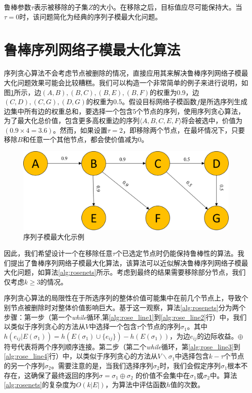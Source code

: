 鲁棒参数\(\tau\)表示被移除的子集\(Z\)的大小。在移除之后，目标值应尽可能保持大。当\(\tau = 0\)时，该问题简化为经典的序列子模最大化问题\cite{mitrovic2018submodularity}。

\section{鲁棒序列网络子模最大化算法}
\label{sec:3_2}

序列贪心算法\cite{mitrovic2018submodularity}不会考虑节点被删除的情况，直接应用其来解决鲁棒序列网络子模最大化问题效果可能会比较糟糕。我们可以构造一个非常简单的例子来进行说明，如图\ref{fig:rose_sample}所示，边$(A,B),(B,C),(B,E),(B,F)$的权重为0.9，边$(C,D),(C,G),(D,G)$的权重为0.5。假设目标网络子模函数\(f\)是所选序列生成边集中所有边的权重总和，要选择一个包含5个节点的序列，使用序列贪心算法，为了最大化总价值，包含更多高权重边的序列\(\langle A,B,C,E,F \rangle\)将会被选中，价值为\((0.9 \times 4 = 3.6)\)。然而，如果设置\(\tau=2\)，即移除两个节点，在最坏情况下，只要移除\(B\)和任意一个其他节点，都会使价值减为$0$。

\begin{figure}[th]
    \centering
    \includegraphics[width=.89\linewidth]{figure/rosenets/sample2}
    \caption{序列子模最大化示例}
    \label{fig:rose_sample}
\end{figure}

因此，我们希望设计一个在移除任意$\tau$个已选定节点时仍能保持鲁棒性的算法。我们提出了鲁棒序列网络子模最大化算法，该算法可以近似解决鲁棒序列网络子模最大化问题，如算法\ref{alg:rosenets}所示。考虑到最终的结果需要移除部分节点，我们仅考虑$k \ge 3$的情况。

序列贪心算法的局限性在于所选序列的整体价值可能集中在前几个节点上，导致个别节点被删除时对整体价值影响巨大。基于这一观察，算法\ref{alg:rosenets}分为两个步骤：第一步（第一个\textit{while}循环,第\ref{alg:rose_line1}到\ref{alg:rose_line2}行）中，我们以类似于序列贪心的方法从\(V\)中选择一个包含\(\tau\)个节点的序列\(\sigma_1\)。其中$h(e_{ij}|E(\sigma_1))=h(E(\sigma_1)\cup\{e_{ij}\})-h(E(\sigma_1))$，为边$e_{ij}$的边际收益。$\oplus$符号代表将两个序列顺序连接。第二步（第二个\textit{while}循环，第\ref{alg:rose_line3}到\ref{alg:rose_line4}行）中，以类似于序列贪心的方法从\(V\backslash \sigma_1\)中选择包含\(k-\tau\)个节点的另一个序列\(\sigma_2\)。需要注意的是，当我们选择序列\(\sigma_2\)时，我们会假定序列\(\sigma_1\)根本不存在，这确保了最终返回的序列\(\sigma = \sigma_1 \oplus \sigma_2\) 的价值不会集中在\(\sigma_1\)或\(\sigma_2\)中。算法\ref{alg:rosenets}的复杂度为\(O(k|E|)\)，为算法中评估函数$h$值的次数。

